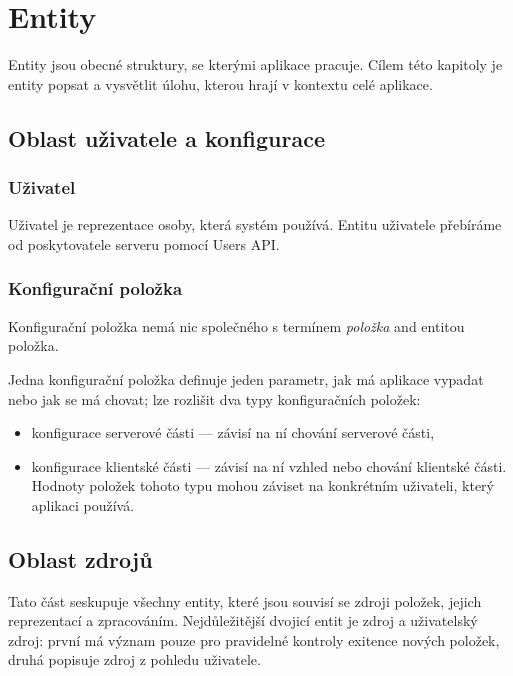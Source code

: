\section{Entity}

Entity jsou obecné struktury, se kterými aplikace pracuje.
Cílem této kapitoly je entity popsat a vysvětlit úlohu, kterou hrají v kontextu celé aplikace.

\subsection{Oblast uživatele a konfigurace}

\subsubsection{Uživatel}

Uživatel je reprezentace osoby, která systém používá.
Entitu uživatele přebíráme od poskytovatele serveru pomocí Users API.

\subsubsection{Konfigurační položka}

Konfigurační položka nemá nic společného s termínem \textit{položka} and entitou položka.

Jedna konfigurační položka definuje jeden parametr, jak má aplikace vypadat nebo jak se má chovat; lze rozlišit dva typy konfiguračních položek:
\begin{itemize}
	\item konfigurace serverové části --- závisí na ní chování serverové části,
	\item konfigurace klientské části --- závisí na ní vzhled nebo chování klientské části.
		Hodnoty položek tohoto typu mohou záviset na konkrétním uživateli, který aplikaci používá.
\end{itemize}

\subsection{Oblast zdrojů}

Tato část seskupuje všechny entity, které jsou souvisí se zdroji položek, jejich reprezentací a zpracováním.
Nejdůležitější dvojicí entit je zdroj a uživatelský zdroj: první má význam pouze pro pravidelné kontroly exitence nových položek, druhá popisuje zdroj z pohledu uživatele.

